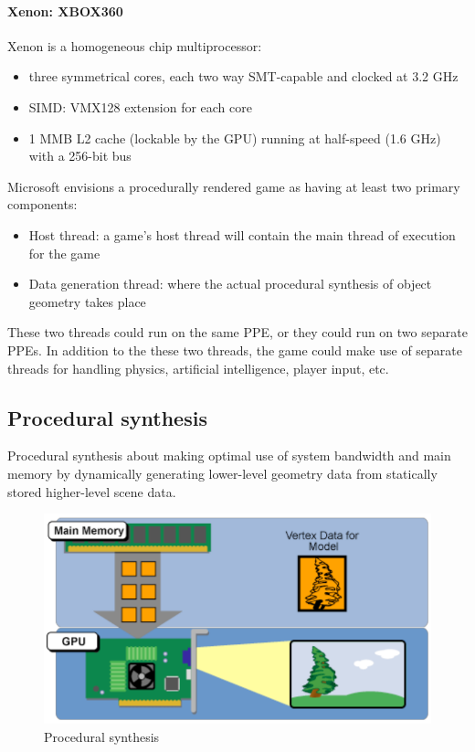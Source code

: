 \paragraph{Xenon: XBOX360}
Xenon is a homogeneous chip multiprocessor:
\begin{itemize}
    \item three symmetrical cores, each two way SMT-capable and clocked at 3.2 GHz
    \item SIMD: VMX128 extension for each core
    \item 1 MMB L2 cache (lockable by the GPU) running at half-speed (1.6 GHz) with a 256-bit bus
\end{itemize}

Microsoft envisions a procedurally rendered game
as having at least two primary components:
\begin{itemize}
    \item Host thread: a game's host thread will contain the main
thread of execution for the game
    \item Data generation thread: where the actual procedural
synthesis of object geometry takes place
\end{itemize}
These two threads could run on the same PPE, or
they could run on two separate PPEs.
In addition to the these two threads, the game
could make use of separate threads for handling
physics, artificial intelligence, player input, etc.


\subsection{Procedural synthesis}\label{subsec:procedural-synthesis}
Procedural synthesis about making optimal use of system bandwidth
and main memory by dynamically generating lower-level geometry
data from statically stored higher-level scene data.

\begin{figure}[h]
    \centering
    \includegraphics[scale = 0.]{images/procedural-synthesis}
    \caption{Procedural synthesis}
    \label{fig:procedural-synthesis}
\end{figure}

